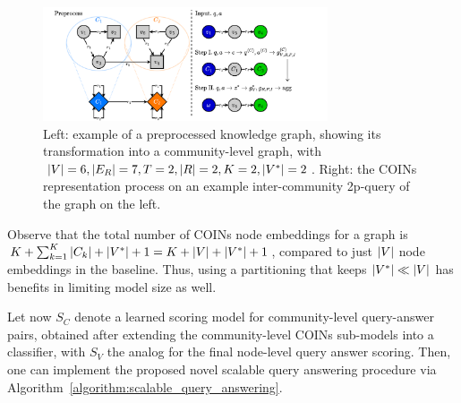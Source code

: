 \begin{figure}[H]
    \centering
    \includegraphics[width=0.75\textwidth]{figures/coins/coins.pdf}
    \caption[Example of a preprocessed knowledge graph and the COINs representation process on an example query.]{Left: example of a preprocessed knowledge graph, showing its transformation into a community-level graph, with $\mathopen{}\left|V\right|=6, \mathopen{}\left|E_R\right|=7, T=2, \mathopen{}\left|R\right|=2, K=2, \mathopen{}\left|V^*\right|=2$. Right: the COINs representation process on an example inter-community 2p-query of the graph on the left.}
    \label{fig:community_preprocessing}
\end{figure}

Observe that the total number of COINs node embeddings for a graph is $K + \sum_{k=1}^{K}{\mathopen{}\left|C_k\right|} + \mathopen{}\left|V^*\right| + 1 = K + \mathopen{}\left|V\right| + \mathopen{}\left|V^*\right| + 1$, compared to just $\mathopen{}\left|V\right|$ node embeddings in the baseline. Thus, using a partitioning that keeps $\mathopen{}\left|V^*\right| \ll \mathopen{}\left|V\right|$ has benefits in limiting model size as well. 

Let now $S_C$ denote a learned scoring model for community-level query-answer pairs, obtained after extending the community-level COINs sub-models into a classifier, with $S_V$ the analog for the final node-level query answer scoring. Then, one can implement the proposed novel scalable query answering procedure via Algorithm~\ref{algorithm:scalable_query_answering}. %

